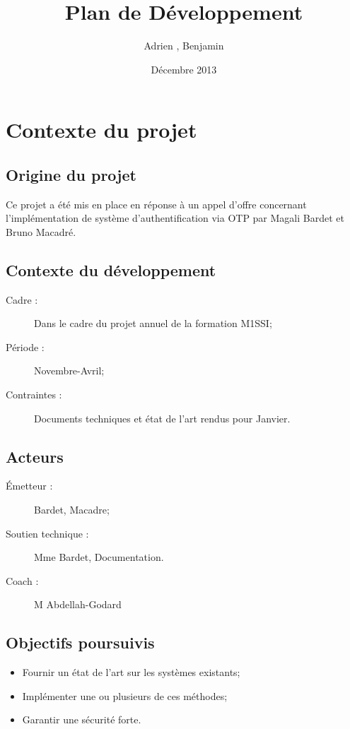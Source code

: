 \documentclass{../../res/univ-projet}
\title{Plan de Développement}
\author{Adrien \bsc{Smondack}, Benjamin \bsc{Zigh}}
\date{Décembre 2013}
\begin{document}
\maketitle

\section{Contexte du projet}
	\subsection{Origine du projet}
	Ce projet a été mis en place en réponse à un appel d'offre concernant 
	l'implémentation de système d'authentification via OTP par Magali Bardet et 
	Bruno Macadré.
	
	\subsection{Contexte du développement}
	\begin{description} 
		\item [Cadre :] Dans le cadre du projet annuel de la formation M1SSI;
		\item [Période :] Novembre-Avril;
		\item [Contraintes :] Documents techniques et état de l'art rendus pour Janvier.
	\end{description}

	\subsection{Acteurs}
	\begin{description}
		\item [Émetteur :] Bardet, Macadre;
		\item [Soutien technique :] Mme Bardet, Documentation.
		\item [Coach :] M Abdellah-Godard
	\end{description}

	\subsection{Objectifs poursuivis}
	\begin{itemize}
		\item Fournir un état de l'art sur les systèmes existants;
		\item Implémenter une ou plusieurs de ces méthodes;
		\item Garantir une sécurité forte.
	\end{itemize}
\end{document}
